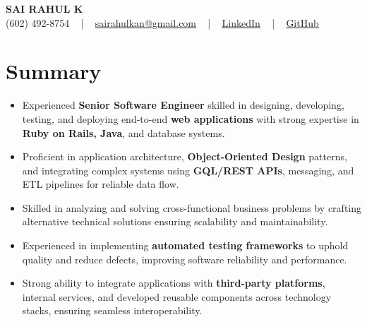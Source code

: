 \documentclass[letterpaper,11pt]{article}
\newcommand{\resumeItem}[1]{
  \item\footnotesize{
    {#1 \vspace{-2pt}}
  }
}
\newcommand{\resumeItemListStart}{\begin{itemize}[leftmargin=*]}
\newcommand{\resumeItemListEnd}{\end{itemize}\vspace{-5pt}}
\begin{document}
\begin{center}
    {\fontsize{14pt}{12pt}\selectfont \textbf{\MakeUppercase{Sai Rahul K}}}\\ \vspace{2pt}
    \fontsize{10pt}{12pt}\selectfont (602) 492-8754 ~ | ~ \href{mailto:sairahulkan@gmail.com}{sairahulkan@gmail.com} ~ | ~
    \href{https://www.linkedin.com/in/rq123/}{\color{blue}\underline{LinkedIn}} ~ | ~
    \href{https://github.com/kanrahuldo}{\color{blue}\underline{GitHub}}~
    \vspace{-8pt}
\end{center}

\section{Summary}
\fontsize{9pt}{10pt}\selectfont
\resumeItemListStart
    \resumeItem{Experienced \textbf{Senior Software Engineer} skilled in designing, developing, testing, and deploying end-to-end \textbf{web applications} with strong expertise in \textbf{Ruby on Rails, Java}, and database systems.}
    \resumeItem{Proficient in application architecture, \textbf{Object-Oriented Design} patterns, and integrating complex systems using \textbf{GQL/REST APIs}, messaging, and ETL pipelines for reliable data flow.}
    \resumeItem{Skilled in analyzing and solving cross-functional business problems by crafting alternative technical solutions ensuring scalability and maintainability.}
    \resumeItem{Experienced in implementing \textbf{automated testing frameworks} to uphold quality and reduce defects, improving software reliability and performance.}
    \resumeItem{Strong ability to integrate applications with \textbf{third-party platforms}, internal services, and developed reusable components across technology stacks, ensuring seamless interoperability.}
\resumeItemListEnd
\vspace{-6pt}
\end{document}
